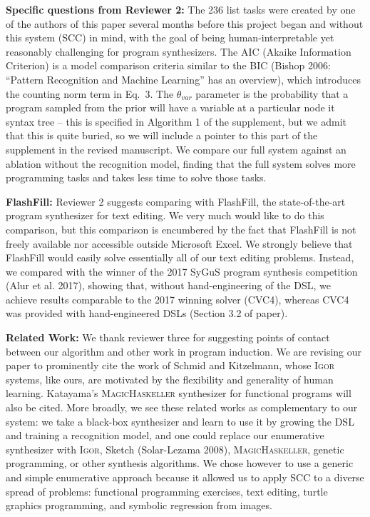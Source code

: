 \documentclass{article}
\begin{document}
\textbf{Specific questions from Reviewer 2:}
The 236 list tasks were created by one of the authors of this paper
several months before this project began
and without this system (SCC) in mind,
with the goal of
being human-interpretable
yet reasonably challenging for
program synthesizers.
The AIC (Akaike Information Criterion) is a model comparison criteria 
similar to the BIC (Bishop 2006: ``Pattern Recognition and Machine Learning'' has an overview),
which introduces the counting norm term in Eq.~3.
The $\theta_{var}$ parameter
is the probability that
a program sampled from the prior will
have a variable at a particular node it syntax tree -- this is specified in Algorithm 1 of the supplement,
but we admit that this is quite buried,
so we will include a pointer to this part of the supplement in the revised manuscript.
We compare our full system against an ablation 
without the recognition model,
finding that
the full system solves more programming tasks and takes less time to
solve those tasks.

\textbf{FlashFill:} Reviewer 2 suggests comparing with FlashFill, the state-of-the-art program synthesizer for text editing.
We very much would like to do this comparison, but this comparison
is encumbered by the fact that FlashFill is not freely available nor accessible outside Microsoft Excel.
We strongly believe that FlashFill would easily solve essentially all of our text editing problems.
Instead, we compared with the winner of the 2017 SyGuS program synthesis competition (Alur et al. 2017), 
showing that, without hand-engineering of the DSL,
we achieve results comparable to the 2017 winning solver (CVC4),
whereas CVC4 was provided with hand-engineered DSLs (Section 3.2 of paper).

\textbf{Related Work:} We thank reviewer three for suggesting points of contact between our algorithm and other work in program induction.
We are revising our paper to prominently cite the work of Schmid and Kitzelmann,
whose \textsc{Igor} systems, like ours,
are motivated by the flexibility and generality of human learning.
Katayama's \textsc{MagicHaskeller} synthesizer for functional programs will also be cited.
More broadly,
we see these  related works as
 complementary to
our system:
we take a black-box synthesizer and
learn to use it by growing the DSL and
training a recognition model,
and one could replace our enumerative synthesizer with
\textsc{Igor}, Sketch (Solar-Lezama 2008), \textsc{MagicHaskeller},
genetic programming, or other synthesis algorithms.
We chose however to
use a generic and simple enumerative approach because it allowed us to apply SCC
to a diverse spread of problems: functional programming exercises, text editing,
turtle graphics programming, and symbolic regression from images.
\end{document}
